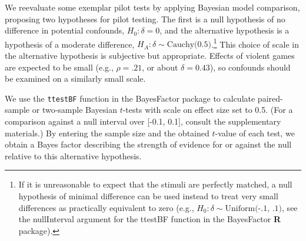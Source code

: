 \documentclass[man]{apa6}
\begin{document}
We reevaluate some exemplar pilot tests by applying Bayesian model comparison, proposing two hypotheses for pilot testing. The first is a null hypothesis of no difference in potential confounds, $H_0: \delta{} = 0$, and the alternative hypothesis is a hypothesis of a moderate difference, $H_A: \delta{} \sim{} \mbox{Cauchy(0.5)}$.\footnote{If it is unreasonable to expect that the stimuli are perfectly matched, a null hypothesis of minimal difference can be used instead to treat very small differences as practically equivalent to zero (e.g., $H_0: \delta{} \sim{} \mbox{Uniform(-.1, .1)}$, see the nullInterval argument for the ttestBF function in the BayesFactor {\bf R} package).} This choice of scale in the alternative hypothesis is subjective but appropriate. Effects of violent games are expected to be small (e.g., $\rho = .21$, or about $\delta = 0.43$), so confounds should be examined on a similarly small scale. 

We use the {\tt ttestBF} function in the BayesFactor package \citep{Morey:Rouder:2014} to calculate paired-sample or two-sample Bayesian $t$-tests with scale on effect size set to 0.5. (For a comparison against a null interval over [-0.1, 0.1], consult the supplementary materials.) By entering the sample size and the obtained $t$-value of each test, we obtain a Bayes factor describing the strength of evidence for or against the null relative to this alternative hypothesis.  
\end{document}

